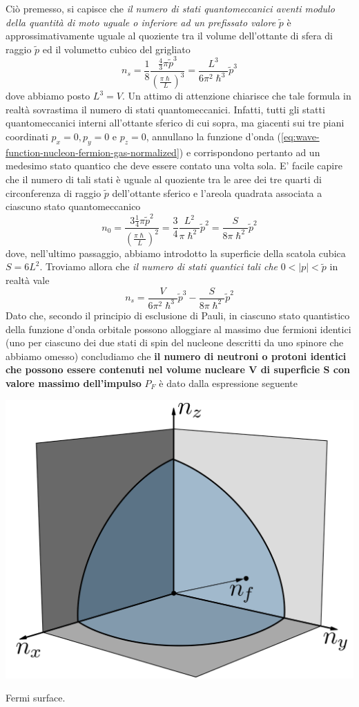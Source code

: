 Ciò premesso, si capisce che \textit{il numero di stati quantomeccanici aventi modulo della quantità di moto uguale o inferiore ad un prefissato valore}
$\tilde{p}$ è approssimativamente uguale al quoziente tra il volume dell’ottante di sfera di raggio $\tilde{p}$ ed il volumetto cubico del grigliato
\[
n_{s} = \frac{1}{8} \frac{ \frac{4}{3} \pi \tilde{p}^{3}}{\left( \frac{\pi \hslash}{L} \right)^{3}} = \frac{L^{3}}{6 \pi^{2}\hslash^{3}}\tilde{p}^{3}
\]
dove abbiamo posto $L^{3} = V$.
Un attimo di attenzione chiarisce che tale formula in realtà sovrastima il numero di stati quantomeccanici.
Infatti, tutti gli statti quantomeccanici interni all’ottante sferico di cui sopra, ma giacenti sui tre piani coordinati $p_x=0, p_y=0$ e $p_z=0$, annullano la funzione d’onda (\ref{eq:wave-function-nucleon-fermion-gas-normalized}) e corrispondono pertanto ad un medesimo stato quantico che deve essere contato una volta sola. E’ facile capire che il numero di tali stati è uguale al quoziente tra le aree dei tre quarti di circonferenza di raggio $\tilde{p}$ dell’ottante sferico e l’areola quadrata associata a ciascuno stato quantomeccanico
\[
n_{0} = \frac{3 \frac{1}{4} \pi \tilde{p}^{2}}{\left( \frac{\pi \hslash}{L} \right)^{2}} = \frac{3}{4} \frac{L^{2}}{\pi \hslash^{2}} \tilde{p}^{2} =
\frac{S}{8\pi \hslash^{2}}\tilde{p}^{2}
\]
dove, nell’ultimo passaggio, abbiamo introdotto la superficie della scatola cubica $S = 6 L^{2}$.
Troviamo allora che \textit{ il numero di stati quantici tali che} $0< | p|<\tilde{p}$  in realtà vale
\[
n_{s} = \frac{V}{6 \pi^{2}\hslash^{3}} \tilde{p}^{3} - \frac{S}{8\pi \hslash^{2}}\tilde{p}^{2}
\]
Dato che, secondo il principio di esclusione di Pauli, in ciascuno stato quantistico della funzione d’onda orbitale possono alloggiare al massimo due fermioni identici (uno per ciascuno dei due stati di spin del nucleone descritti da uno spinore che abbiamo omesso) concludiamo che \textbf{il numero di neutroni o protoni identici che possono essere contenuti nel volume nucleare V di superficie S con valore massimo dell’impulso} $P_F$ è dato dalla espressione seguente
\begin{marginfigure}
	\includegraphics{figs/Fermi-surface}
	\caption{Fermi surface.}
\end{marginfigure}

